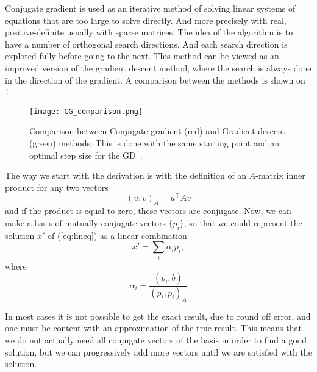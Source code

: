 Conjugate gradient is used as an iterative method of solving linear systems of equations that are too large to solve directly. And more precisely with real,  positive-definite usually with sparse matrices. The idea of the algorithm is to have a number of orthogonal search directions. And each search direction is explored fully before going to the next. This method can be viewed as an improved version of the gradient descent method, where the search is always done in the direction of the gradient. A comparison between the methods is shown on   \cref{fig:cg_comp}.
\begin{figure}[htbp]
    \centerline{\texttt{[image: CG\_comparison.png]}}
    \caption{Comparison between Conjugate gradient (red) and Gradient descent (green) methods. This is done with the same starting point and an optimal step size for the GD~\cite{pic-cg}.}
    \label{fig:cg_comp}
\end{figure}

The way we start with the derivation is with the definition of an $A$-matrix inner product for any two vectors
\begin{equation}
    \left( u, v \right)_A = u^\top A v
    \label{eq:cg_constraint}
\end{equation}
and if the product is equal to zero, these vectors are conjugate. Now, we can make a basis of mutually conjugate vectors $\{ p_i \}$, so that we could represent the solution $x'$ of (\cref{eq:lineq}) as a linear combination
\begin{equation}
    x' = \sum_i \alpha_i p_i,
\end{equation}
where
\begin{equation}
    \alpha_i = \frac{\left( p_i, b \right)}{\left( p_i, p_i \right)_A}
\end{equation}

In most cases it is not possible to get the exact result, due to round off error, and one must be content with an approximation of the true result. This means that we do not actually need all conjugate vectors of the basis in order to find a good solution, but we can progressively add more vectors until we are satisfied with the solution.

